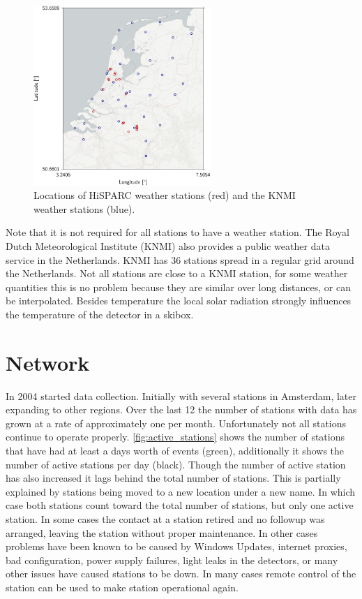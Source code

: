 \begin{figure}
    \centering
    \includegraphics[width=0.6\textwidth]
                    {plots/experiment/map_weather_knmi}
    \caption{Locations of HiSPARC weather stations (red) and the KNMI weather stations (blue).}
    \label{fig:map_weather_knmi}
\end{figure}

Note that it is not required for all stations to have a weather station. The Royal Dutch Meteorological Institute (KNMI) also provides a public weather data service in the Netherlands. KNMI has 36 stations spread in a regular grid around the Netherlands. Not all \hisparc stations are close to a KNMI station, for some weather quantities this is no problem because they are similar over long distances, or can be interpolated. Besides temperature the local solar radiation strongly influences the temperature of the detector in a skibox.


\section{Network}

In 2004 \hisparc started data collection. Initially with several stations in Amsterdam, later expanding to other regions. Over the last \SI{12}{\year} the number of stations with data has grown at a rate of approximately one per month. Unfortunately not all stations continue to operate properly. \cref{fig:active_stations} shows the number of stations that have had at least a days worth of events (green), additionally it shows the number of active stations per day (black). Though the number of active station has also increased it lags behind the total number of stations. This is partially explained by stations being moved to a new location under a new name. In which case both stations count toward the total number of stations, but only one active station. In some cases the contact at a station retired and no followup was arranged, leaving the station without proper maintenance. In other cases problems have been known to be caused by Windows Updates, internet proxies, bad configuration, power supply failures, light leaks in the detectors, or many other issues have caused stations to be down. In many cases remote control of the station can be used to make station operational again.

